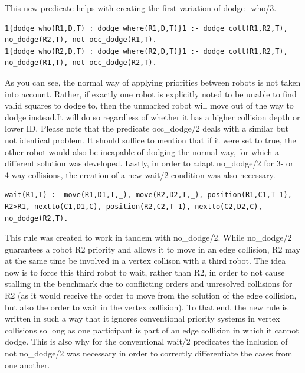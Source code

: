 \documentclass{llncs}
\begin{document}
This new predicate helps with creating the first variation of dodge\_who/3.
\begin{lstlisting}[basicstyle=\fontsize{9}{11}\selectfont\ttfamily,frame=single,breaklines=true]
1{dodge_who(R1,D,T) : dodge_where(R1,D,T)}1 :- dodge_coll(R1,R2,T), no_dodge(R2,T), not occ_dodge(R1,T).
1{dodge_who(R2,D,T) : dodge_where(R2,D,T)}1 :- dodge_coll(R1,R2,T), no_dodge(R1,T), not occ_dodge(R2,T).
\end{lstlisting}
As you can see, the normal way of applying priorities between robots is not taken into account. Rather, if exactly one robot is explicitly noted to be unable to find valid squares to dodge to, then the unmarked robot will move out of the way to dodge instead.\newline It will do so regardless of whether it has a higher collision depth or lower ID. Please note that the predicate occ\_dodge/2 deals with a similar but not identical problem. It should suffice to mention that if it were set to true, the other robot would also be incapable of dodging the normal way, for which a different solution was developed.\newline\newline
Lastly, in order to adapt no\_dodge/2 for 3- or 4-way collisions, the creation of a new wait/2 condition was also necessary.\newpage
\begin{lstlisting}[basicstyle=\fontsize{9}{11}\selectfont\ttfamily,frame=single,breaklines=true]
wait(R1,T) :- move(R1,D1,T,_), move(R2,D2,T,_), position(R1,C1,T-1), R2>R1, nextto(C1,D1,C), position(R2,C2,T-1), nextto(C2,D2,C), no_dodge(R2,T).
\end{lstlisting}
This rule was created to work in tandem with no\_dodge/2. While no\_dodge/2 guarantees a robot R2 priority and allows it to move in an edge collision, R2 may at the same time be involved in a vertex collison with a third robot. The idea now is to force this third robot to wait, rather than R2, in order to not cause stalling in the benchmark due to conflicting orders and unresolved collisions for R2 (as it would receive the order to move from the solution of the edge collision, but also the order to wait in the vertex collision).\newline
To that end, the new rule is written in such a way that it ignores conventional priority systems in vertex collisions so long as one participant is part of an edge collision in which it cannot dodge. This is also why for the conventional wait/2 predicates the inclusion of not no\_dodge/2 was necessary in order to correctly differentiate the cases from one another.
\end{document}
